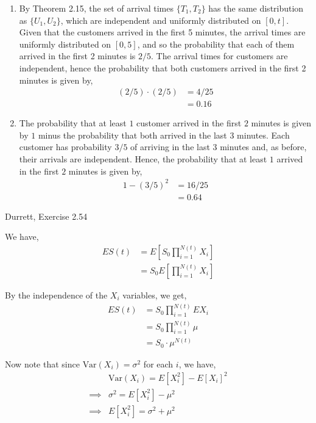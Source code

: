 \documentclass[12pt]{article}
\newenvironment{problem}[2][Problem]{\begin{trivlist}
\item[\hskip \labelsep {\bfseries #1}\hskip \labelsep {\bfseries #2.}]}{\end{trivlist}}
\begin{document}
\begin{enumerate}[label=\alph*]

\item By Theorem 2.15, the set of arrival times $\{T_1, T_2\}$ has the same distribution as $\{U_1, U_2\}$, which are independent and uniformly distributed on $[0, t]$. Given that the customers arrived in the first 5 minutes, the arrival times are uniformly distributed on $[0, 5]$, and so the probability that each of them arrived in the first 2 minutes is $2/5$. The arrival times for customers are independent, hence the probability that both customers arrived in the first 2 minutes is given by,
\begin{align*}
(2/5) \cdot (2/5) &= 4/25\\
&= 0.16
\end{align*}

\item The probability that at least $1$ customer arrived in the first $2$ minutes is given by $1$ minus the probability that both arrived in the last $3$ minutes. Each customer has probability $3/5$ of arriving in the last $3$ minutes and, as before, their arrivals are independent. Hence, the probability that at least $1$ arrived in the first $2$ minutes is given by,
\begin{align*}
1 - (3/5)^2 &= 16/25\\
&= 0.64
\end{align*}

\end{enumerate}

\newpage

\begin{problem}{3}
Durrett, Exercise 2.54
\end{problem}

We have,
\begin{align*}
ES(t) &= E \left[ S_0 \prod_{i = 1}^{N(t)} X_i \right]\\
&= S_0 E \left [ \prod_{i = 1}^{N(t)} X_i \right]
\end{align*}

By the independence of the $X_i$ variables, we get,
\begin{align*}
ES(t) &= S_0 \prod_{i = 1}^{N(t)} EX_i\\
&= S_0 \prod_{i=1}^{N(t)} \mu\\
&= S_0 \cdot \mu^{N(t)}
\end{align*}

Now note that since $\text{Var}(X_i) = \sigma^2$ for each $i$, we have,
\begin{align*}
&\text{Var}(X_i) = E[X_i^2] - E[X_i]^2\\
\implies &\sigma^2 = E[X_i^2] - \mu^2\\
\implies &E[X_i^2] = \sigma^2 + \mu^2
\end{align*}
\end{document}
